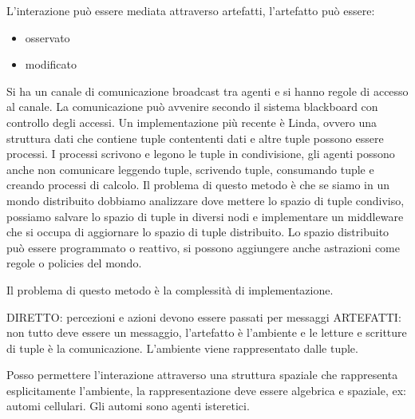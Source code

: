 L'interazione può essere mediata attraverso artefatti, l'artefatto può essere:
\begin{itemize}
    \item osservato
    \item modificato
\end{itemize}
Si ha un canale di comunicazione broadcast tra agenti e si hanno regole di accesso 
al canale.
La comunicazione può avvenire secondo il sistema blackboard con controllo degli accessi.
Un implementazione più recente è Linda, ovvero una struttura dati che contiene tuple
contententi dati e altre tuple possono essere processi. I processi scrivono e legono
le tuple in condivisione, gli agenti possono anche non comunicare leggendo tuple,
scrivendo tuple, consumando tuple e creando processi di calcolo. Il problema di 
questo metodo è che se siamo in un mondo distribuito dobbiamo analizzare dove 
mettere lo spazio di tuple condiviso, possiamo salvare lo spazio di tuple 
in diversi nodi e implementare un middleware che si occupa di aggiornare lo spazio
di tuple distribuito. Lo spazio distribuito può essere programmato o reattivo,
si possono aggiungere anche astrazioni come regole o policies del mondo.

Il problema di questo metodo è la complessità di implementazione.

DIRETTO: percezioni e azioni devono essere passati per messaggi
ARTEFATTI: non tutto deve essere un messaggio, l'artefatto è l'ambiente e le letture 
e scritture di tuple è la comunicazione. L'ambiente viene rappresentato dalle tuple.

Posso permettere l'interazione attraverso una struttura spaziale che rappresenta 
esplicitamente l'ambiente, la rappresentazione deve essere algebrica e spaziale, 
ex: automi cellulari. Gli automi sono agenti isteretici.

